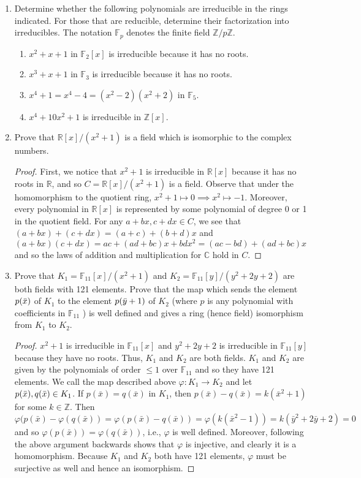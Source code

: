 \documentclass{report}
\newcommand{\Z}{\mathbb{Z}}
\newcommand{\R}{\mathbb{R}}
\newcommand{\C}{\mathbb{C}}
\begin{document}
\begin{enumerate}
	\item Determine whether the following polynomials are irreducible in the rings indicated.
	For those that are reducible, determine their factorization into irreducibles.
	The notation $ \mathbb{F}_p$ denotes the finite field $\Z/p\Z$.
	\begin{enumerate}
		\item $x^2 + x + 1$ in $ \mathbb{F}_2[x]$ is irreducible because it has no roots.
		\item $x^3 + x + 1$ in $ \mathbb{F}_3 $ is irreducible because it has no roots.
		\item $x^4 + 1=x^4-4=(x^2-2)(x^2+2)$ in $ \mathbb{F}_5 $.
		\item $x^4+10x^2+1$ is irreducible in $\Z[x]$.
	\end{enumerate}

	\setcounter{enumi}{6}
	\item Prove that $\R[x]/(x^2+1)$ is a field which is isomorphic to the complex numbers.
	\begin{proof}
		First, we notice that $x^2+1$ is irreducible in $\R[x]$ because it has no roots in $\R$, and so $C=\R[x]/(x^2+1)$ is a field.
		Observe that under the homomorphism to the quotient ring, $x^2+1\mapsto 0\implies x^2\mapsto -1$.
		Moreover, every polynomial in $\R[x]$ is represented by some polynomial of degree 0 or 1 in the quotient field.
		For any $a+bx, c+dx\in C$, we see that $(a+bx)+(c+dx)=(a+c)+(b+d)x$ and $(a+bx)(c+dx)=ac+(ad + bc)x + bdx^2=(ac-bd)+(ad+bc)x$
		and so the laws of addition and multiplication for $\C$ hold in $C$.
	\end{proof}
	\item Prove that $K_1= \mathbb{F}_{11}[x]/(x^2+1)$ and $K_2 = \mathbb{F}_{11}[y]/(y^2+2y+2)$ are both fields with 121 elements.
	Prove that the map which sends the element $p(\Bar{x})$ of $K_1$ to the element $p(\Bar{y}+1)$ of $K_2$
	(where $p$ is any polynomial with coefficients in $ \mathbb{F}_{11}$ ) is well defined and gives a ring (hence field) isomorphism from $K_1$ to $K_2$.
	\begin{proof}
		$x^2+1$ is irreducible in $ \mathbb{F}_{11}[x]$ and $y^2+2y+2$ is irreducible in $ \mathbb{F}_{11}[y]$ because they have no roots.
		Thus, $K_1$ and $K_2$ are both fields. $K_1$ and $K_2$ are given by the polynomials of order $\leq 1$ over $ \mathbb{F}_{11}$ and so they have 121 elements. 
		We call the map described above $\varphi:K_1\rightarrow K_2$ and let $p(\Bar{x}), q(\Bar{x})\in K_1$.
		If $p(\bar{x})=q(\bar{x})$ in $K_1$, then $p(\bar{x})-q(\bar{x})=k(\bar{x}^2+1)$ for some $k\in\Z$.
		Then $$\varphi(p(\bar{x})-\varphi(q(\bar{x})) = \varphi(p(\bar{x})-q(\bar{x}))=\varphi(k(\bar{x}^2-1))=k(\bar{y}^2+2\bar{y}+2)=0$$
		and so $\varphi(p(\bar{x}))=\varphi(q(\bar{x}))$, i.e., $\varphi$ is well defined.
		Moreover, following the above argument backwards shows that $\varphi$ is injective, and clearly it is a homomorphism.
		Because $K_1$ and $K_2$ both have 121 elements, $\varphi$ must be surjective as well and hence an isomorphism.
	\end{proof}
	

\end{enumerate}
\end{document}
